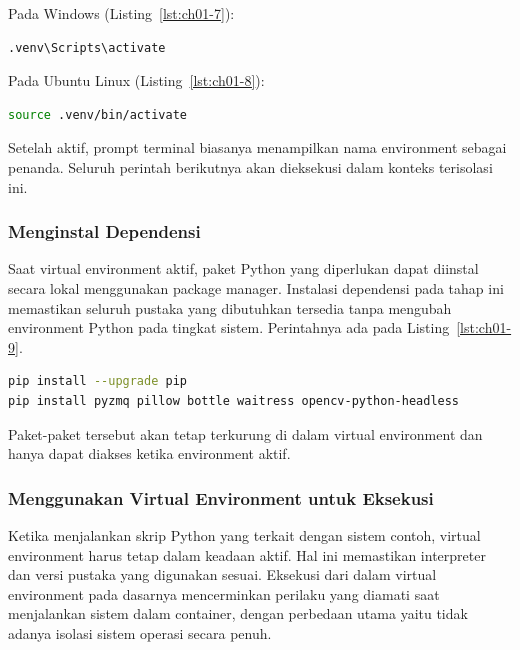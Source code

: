 Pada Windows (Listing~\ref{lst:ch01-7}):

\begin{lstlisting}[language=bash, caption={Mengaktifkan virtual environment}, label={lst:ch01-7}]
.venv\Scripts\activate
\end{lstlisting}

Pada Ubuntu Linux (Listing~\ref{lst:ch01-8}):

\begin{lstlisting}[language=bash, caption={Mengaktifkan virtual environment di Ubuntu}, label={lst:ch01-8}]
source .venv/bin/activate
\end{lstlisting}

Setelah aktif, prompt terminal biasanya menampilkan nama environment sebagai
penanda. Seluruh perintah berikutnya akan dieksekusi dalam konteks terisolasi ini.

\subsubsection{Menginstal Dependensi}

Saat virtual environment aktif, paket Python yang diperlukan dapat diinstal
secara lokal menggunakan package manager. Instalasi dependensi pada tahap ini
memastikan seluruh pustaka yang dibutuhkan tersedia tanpa mengubah environment
Python pada tingkat sistem. Perintahnya ada pada Listing~\ref{lst:ch01-9}.

\begin{lstlisting}[language=bash, caption={Memasang dependensi Python}, label={lst:ch01-9}]
pip install --upgrade pip
pip install pyzmq pillow bottle waitress opencv-python-headless
\end{lstlisting}

Paket-paket tersebut akan tetap terkurung di dalam virtual environment dan hanya
dapat diakses ketika environment aktif.

\subsubsection{Menggunakan Virtual Environment untuk Eksekusi}

Ketika menjalankan skrip Python yang terkait dengan sistem contoh, virtual
environment harus tetap dalam keadaan aktif. Hal ini memastikan interpreter dan
versi pustaka yang digunakan sesuai. Eksekusi dari dalam virtual environment
pada dasarnya mencerminkan perilaku yang diamati saat menjalankan sistem dalam
container, dengan perbedaan utama yaitu tidak adanya isolasi sistem operasi
secara penuh.

